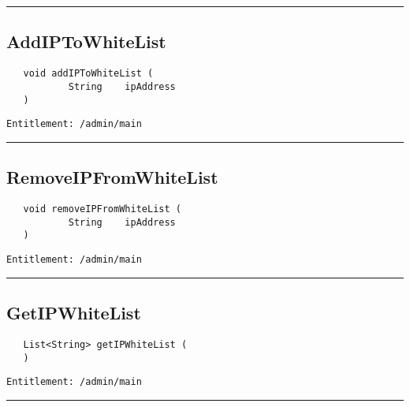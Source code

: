 \rule{12cm}{2pt}
\subsection{AddIPToWhiteList}
\label{Api:AddIPToWhiteList}
\begin{verbatim}
   void addIPToWhiteList (
           String    ipAddress
   )
\end{verbatim}
\begin{Verbatim}[fontsize=\small, formatcom=\color{Maroon}]
  Entitlement: /admin/main
\end{Verbatim}



\rule{12cm}{2pt}
\subsection{RemoveIPFromWhiteList}
\label{Api:RemoveIPFromWhiteList}
\begin{verbatim}
   void removeIPFromWhiteList (
           String    ipAddress
   )
\end{verbatim}
\begin{Verbatim}[fontsize=\small, formatcom=\color{Maroon}]
  Entitlement: /admin/main
\end{Verbatim}



\rule{12cm}{2pt}
\subsection{GetIPWhiteList}
\label{Api:GetIPWhiteList}
\begin{verbatim}
   List<String> getIPWhiteList (
   )
\end{verbatim}
\begin{Verbatim}[fontsize=\small, formatcom=\color{Maroon}]
  Entitlement: /admin/main
\end{Verbatim}



\rule{12cm}{2pt}
